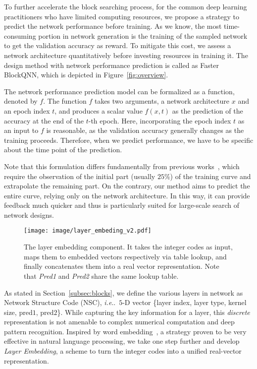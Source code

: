 \documentclass[10pt,journal,compsoc]{IEEEtran}
\makeatletter
\DeclareRobustCommand\onedot{\futurelet\@let@token\@onedot}
\def\@onedot{\ifx\@let@token.\else.\null\fi\xspace}
\def\ie{\emph{i.e}\onedot} \def\Ie{\emph{I.e}\onedot}
\makeatother
\begin{document}
To further accelerate the block searching process, for the common deep learning practitioners who have limited computing resources, we propose a strategy to predict the network performance before training.
As we know, the most time-consuming portion in network generation is the training of the sampled network to get the validation accuracy as reward. To mitigate this cost, we assess a network architecture quantitatively before investing resources in training it.
The design method with network performance prediction is called as Faster BlockQNN, which is depicted in Figure~\ref{fig:overview}.


The network performance prediction model can be formalized as a function, denoted by $f$.
The function $f$ takes two arguments,
a network architecture $x$ and an epoch index $t$, and produces
a scalar value $f(x, t)$ as the prediction of the accuracy
at the end of the $t$-th epoch.
Here, incorporating the epoch index $t$ as an input to $f$ is reasonable,
as the validation accuracy generally changes as the training proceeds.
Therefore, when we predict performance, we have to be specific about
the time point of the prediction.


Note that this formulation differs fundamentally from
previous works~\cite{domhan2015speeding,klein2016learning,baker2017practical}, which require the observation of the initial part (usually $25\%$)
of the training curve and extrapolate the remaining part.
On the contrary, our method aims to predict the entire curve, relying only
on the network architecture.
In this way, it can provide feedback much quicker and thus is particularly
suited for large-scale search of network designs.





\label{subsec:embedding}
\begin{figure}[t]
	\begin{center}
		\texttt{[image: image/layer\_embeding\_v2.pdf]}
	\end{center}
	\caption{\small
		The layer embedding component. It takes the integer codes
		as input, maps them to embedded vectors respectively via
		table lookup, and finally concatenates them into a real
		vector representation. Note that \emph{Pred1} and \emph{Pred2}
		share the same lookup table.
	}
	\label{fig:embedding}
\end{figure}



As stated in Section~\ref{subsec:blocks}, we define the various layers in network as Network Structure Code (NSC), \ie~$5$-D vector \{layer index, layer type, kernel size, pred$1$, pred$2$\}.
While capturing the key information for a layer,
this \emph{discrete} representation is not amenable to
complex numerical computation and deep pattern recognition.
Inspired by word embedding~\cite{mikolov2013distributed},
a strategy proven to be very effective in natural language processing,
we take one step further and develop
\emph{Layer Embedding}, a scheme to turn the integer codes into
a unified real-vector representation.
\end{document}
